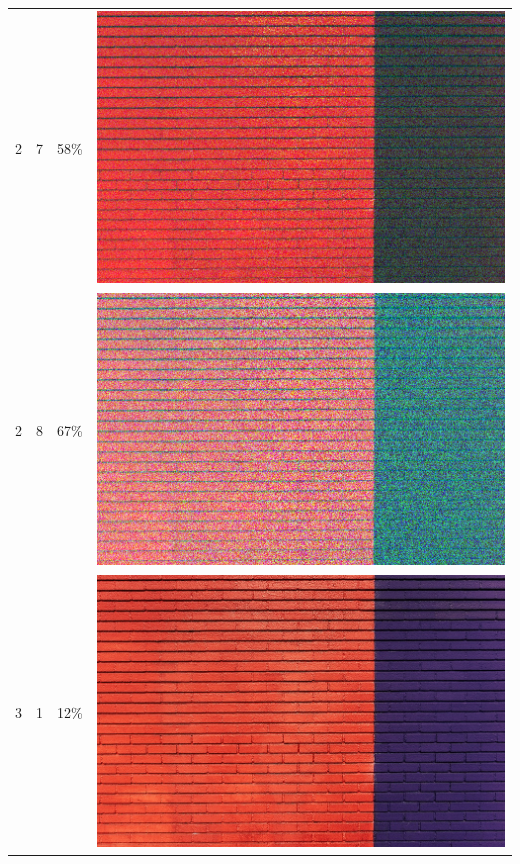 \documentclass[times, utf8, seminar]{fer}
\begin{document}
\begin{center}
\begin{longtable}{|c|c|c|c|}
2 & 7 &58\% & \includegraphics[scale=0.3]{../benchmark_results/pattern/2_components-7_bits.png} \\
2 & 8 &67\% & \includegraphics[scale=0.3]{../benchmark_results/pattern/2_components-8_bits.png} \\
3 & 1 &12\% & \includegraphics[scale=0.3]{../benchmark_results/pattern/3_components-1_bits.png} \\

\end{longtable}
\end{center}
\end{document}
